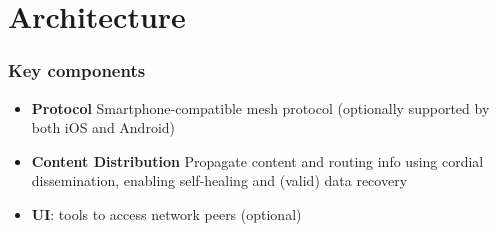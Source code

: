 \section{Architecture}
\begin{frame}
    \frametitle{Key components}
    \begin{itemize}
        \item \textbf{Protocol} Smartphone-compatible mesh protocol (optionally supported by both iOS and Android)
        \item \textbf{Content Distribution} Propagate content and routing info using cordial dissemination, enabling self-healing and (valid) data recovery
        \item \textbf{UI}: tools to access network peers (optional)
    \end{itemize}
\end{frame}